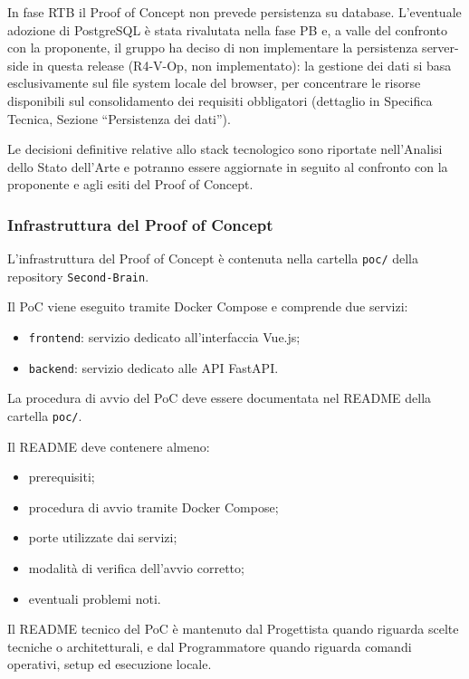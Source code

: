 In fase RTB il Proof of Concept non prevede persistenza su database. L'eventuale
adozione di PostgreSQL è stata rivalutata nella fase PB e, a valle del
confronto con la proponente, il gruppo ha deciso di non implementare la
persistenza server-side in questa release (R4-V-Op, non implementato):
la gestione dei dati si basa esclusivamente sul file system locale del
browser, per concentrare le risorse disponibili sul consolidamento dei
requisiti obbligatori (dettaglio in Specifica Tecnica, Sezione ``Persistenza
dei dati'').

Le decisioni definitive relative allo stack tecnologico sono riportate
nell'Analisi dello Stato dell'Arte e potranno essere aggiornate in seguito al
confronto con la proponente e agli esiti del Proof of Concept.


\subsubsection{Infrastruttura del Proof of Concept}

L'infrastruttura del Proof of Concept è contenuta nella cartella \texttt{poc/}
della repository \texttt{Second-Brain}.

Il PoC viene eseguito tramite Docker Compose e comprende due servizi:

\begin{itemize}
    \item \texttt{frontend}: servizio dedicato all'interfaccia Vue.js;
    \item \texttt{backend}: servizio dedicato alle API FastAPI.
\end{itemize}

La procedura di avvio del PoC deve essere documentata nel README della cartella
\texttt{poc/}.

Il README deve contenere almeno:

\begin{itemize}
    \item prerequisiti;
    \item procedura di avvio tramite Docker Compose;
    \item porte utilizzate dai servizi;
    \item modalità di verifica dell'avvio corretto;
    \item eventuali problemi noti.
\end{itemize}

Il README tecnico del PoC è mantenuto dal Progettista quando riguarda scelte
tecniche o architetturali, e dal Programmatore quando riguarda comandi operativi,
setup ed esecuzione locale.

